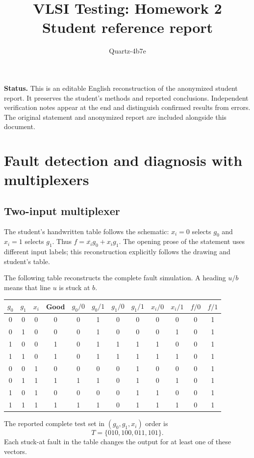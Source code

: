 \documentclass[11pt,a4paper]{article}
\title{VLSI Testing: Homework 2\\Student reference report}
\author{Quartz-4b7e}\date{}
\begin{document}
\maketitle
\textbf{Status.} This is an editable English reconstruction of the anonymized student report. It preserves the student's methods and reported conclusions. Independent verification notes appear at the end and distinguish confirmed results from errors. The original statement and anonymized report are included alongside this document.
\section{Fault detection and diagnosis with multiplexers}
\subsection{Two-input multiplexer}
The student's handwritten table follows the schematic: $x_i=0$ selects $g_0$ and $x_i=1$ selects $g_1$. Thus $f=\overline{x_i}g_0+x_i g_1$. The opening prose of the statement uses different input labels; this reconstruction explicitly follows the drawing and student's table.

The following table reconstructs the complete fault simulation. A heading $u/b$ means that line $u$ is stuck at $b$.
\begin{center}\small
\begin{tabular}{ccc|c|cccccccc}\toprule
$g_0$&$g_1$&$x_i$&Good&$g_0/0$&$g_0/1$&$g_1/0$&$g_1/1$&$x_i/0$&$x_i/1$&$f/0$&$f/1$\\\midrule
0&0&0&0&0&1&0&0&0&0&0&1\\
0&1&0&0&0&1&0&0&0&1&0&1\\
1&0&0&1&0&1&1&1&1&0&0&1\\
1&1&0&1&0&1&1&1&1&1&0&1\\
0&0&1&0&0&0&0&1&0&0&0&1\\
0&1&1&1&1&1&0&1&0&1&0&1\\
1&0&1&0&0&0&0&1&1&0&0&1\\
1&1&1&1&1&1&0&1&1&1&0&1\\\bottomrule
\end{tabular}\end{center}
The reported complete test set in $(g_0,g_1,x_i)$ order is
\[T=\{010,100,011,101\}.\]
Each stuck-at fault in the table changes the output for at least one of these vectors.
\end{document}
